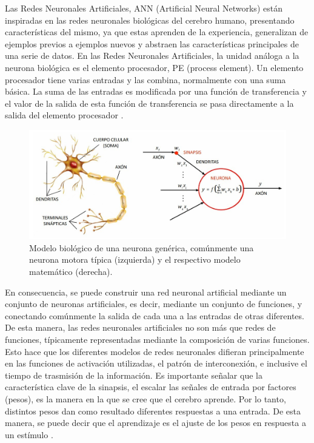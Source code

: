 Las Redes Neuronales Artificiales, ANN (Artificial Neural Networks) están inspiradas en las redes neuronales biológicas del cerebro humano, presentando características del mismo, ya que estas aprenden de la experiencia, generalizan de ejemplos previos a ejemplos nuevos y abstraen las características principales de una serie de datos. En las Redes Neuronales Artificiales, la unidad análoga a la neurona biológica es el elemento procesador, PE (process element). Un elemento procesador tiene varias entradas y las combina, normalmente con una suma básica. La suma de las entradas es modificada por una función de transferencia y el valor de la salida de esta función de transferencia se pasa directamente a la salida del elemento procesador \cite{Basogain08}. \\

\begin{figure} [h!]
    \begin{center}
      \includegraphics[width=13cm]{figs/Modelo neurona.jpeg}
    \end{center}
    \caption{Modelo biológico de una neurona genérica, comúnmente una neurona motora típica (izquierda) y el respectivo modelo matemático (derecha).}
    \label{fig:Modelo neurona}
\end{figure}

En consecuencia, se puede construir una red neuronal artificial mediante un conjunto de neuronas artificiales, es decir, mediante un conjunto de funciones, y conectando comúnmente la salida de cada una a las entradas de otras diferentes. De esta manera, las redes neuronales artificiales no son más que redes de funciones, típicamente representadas mediante la composición de varias funciones. Esto hace que los diferentes modelos de redes neuronales difieran principalmente en las funciones de activación utilizadas, el patrón de interconexión, e inclusive el tiempo de trasmisión de la información. Es importante señalar que la característica clave de la sinapsis, el escalar las señales de entrada por factores (pesos), es la manera en la que se cree que el cerebro aprende. Por lo tanto, distintos pesos dan como resultado diferentes respuestas a una entrada. De esta manera, se puede decir que el aprendizaje es el ajuste de los pesos en respuesta a un estímulo \cite{Dinamarca18}.

